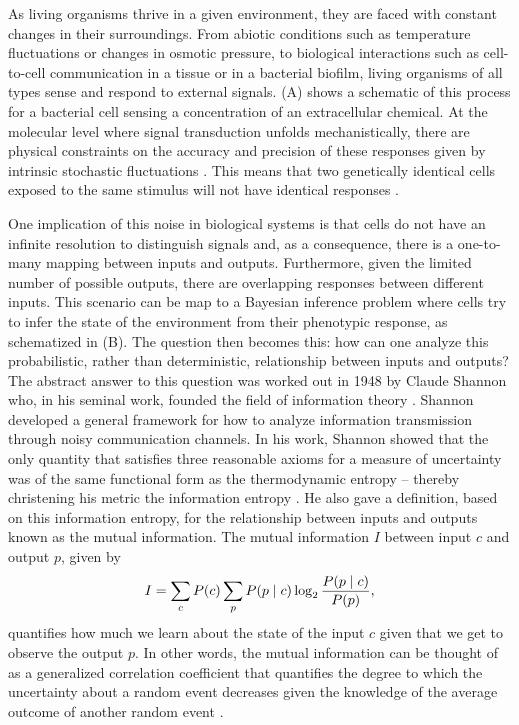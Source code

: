 As living organisms thrive in a given environment, they are faced with
constant changes in their surroundings. From abiotic conditions such as
temperature fluctuations or changes in osmotic pressure, to biological
interactions such as cell-to-cell communication in a tissue or in a bacterial
biofilm, living organisms of all types sense and respond to external signals.
(A) shows a schematic of this process for a bacterial cell
sensing a concentration of an extracellular chemical. At the molecular level
where signal transduction unfolds mechanistically, there are physical
constraints on the accuracy and precision of these responses given by intrinsic
stochastic fluctuations \cite{Nemenman2010}. This means that two genetically
identical cells exposed to the same stimulus will not have identical responses
\cite{Eldar2010}.

One implication of this noise in biological systems is that cells do not have
an infinite resolution to distinguish signals and, as a consequence, there is a
one-to-many mapping between inputs and outputs. Furthermore, given the limited
number of possible outputs, there are overlapping responses between different
inputs. This scenario can be map to a Bayesian inference problem where cells
try to infer the state of the environment from their phenotypic response, as
schematized in (B). The question then becomes this: how can
one analyze this probabilistic, rather than deterministic, relationship between
inputs and outputs? The abstract answer to this question was worked out in 1948
by Claude Shannon who, in his seminal work, founded the field of information
theory \cite{Shannon1948}. Shannon developed a general framework for how to
analyze information transmission through noisy communication channels. In his
work, Shannon showed that the only quantity that satisfies three reasonable
axioms for a measure of uncertainty was of the same functional form as the
thermodynamic entropy -- thereby christening his metric the information entropy
\cite{MacKay2003}. He also gave a definition, based on this information
entropy, for the relationship between inputs and outputs known as the mutual
information. The mutual information $I$ between input $c$ and output $p$, given
by
\begin{equation}
  I = \sum_c P(c) \sum_p P(p \mid c) \log_2 {P(p \mid c) \over P(p)},
	\label{eq_mutual_info}
\end{equation}
quantifies how much we learn about the state of the input $c$ given that we get
to observe the output $p$. In other words, the mutual information can be
thought of as a generalized correlation coefficient that quantifies the degree
to which the uncertainty about a random event decreases given the knowledge of
the average outcome of another random event \cite{Kinney2010}.

